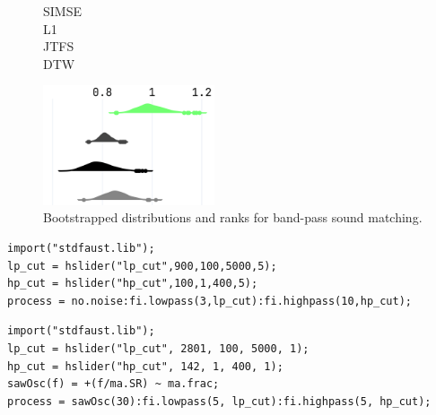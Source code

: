 \documentclass{article} %
\newcommand{\BPNoise}{\textbf{BP-Noise}\xspace}
\newcommand{\BPSaw}{\textbf{BP-Saw}\xspace}
\begin{document}
 \begin{figure}[htbp]
  \centering
    \begin{minipage}{\textwidth}
      \begin{minipage}{0.03\textwidth}
        \footnotesize\raggedleft
        \vspace{0.5cm}
        SIMSE\\[0.6cm]
        L1\\[0.65cm]
        JTFS\\[0.65cm]
        DTW
      \end{minipage}%
      \begin{minipage}{0.96\textwidth}\centering
        \includegraphics[width=0.45\textwidth]{images/npsk_ood_P_Loss_3.png}%
        \hspace{0.03\textwidth}%
      \end{minipage}
    \end{minipage}
     \caption{Bootstrapped distributions and ranks for band-pass sound matching.}
  \label{fig:npsk_BP}
  
\end{figure}
 


\begin{lstlisting}[caption={\BPNoise}, label={lst:program0}, language=Faust,
                  float, floatplacement=!H, xleftmargin=1em, xrightmargin=0.5em, firstnumber=0, aboveskip=0em, belowskip=-1em]
import("stdfaust.lib");
lp_cut = hslider("lp_cut",900,100,5000,5);
hp_cut = hslider("hp_cut",100,1,400,5);
process = no.noise:fi.lowpass(3,lp_cut):fi.highpass(10,hp_cut);
\end{lstlisting}

\begin{lstlisting}[caption={\BPSaw}, label={lst:program0_saw}, language=Faust,
                  float, floatplacement=!H, xleftmargin=1em, xrightmargin=0.5em, firstnumber=0, aboveskip=0em, belowskip=-1em]
import("stdfaust.lib");
lp_cut = hslider("lp_cut", 2801, 100, 5000, 1);
hp_cut = hslider("hp_cut", 142, 1, 400, 1);
sawOsc(f) = +(f/ma.SR) ~ ma.frac;
process = sawOsc(30):fi.lowpass(5, lp_cut):fi.highpass(5, hp_cut);
\end{lstlisting}
\end{document}
